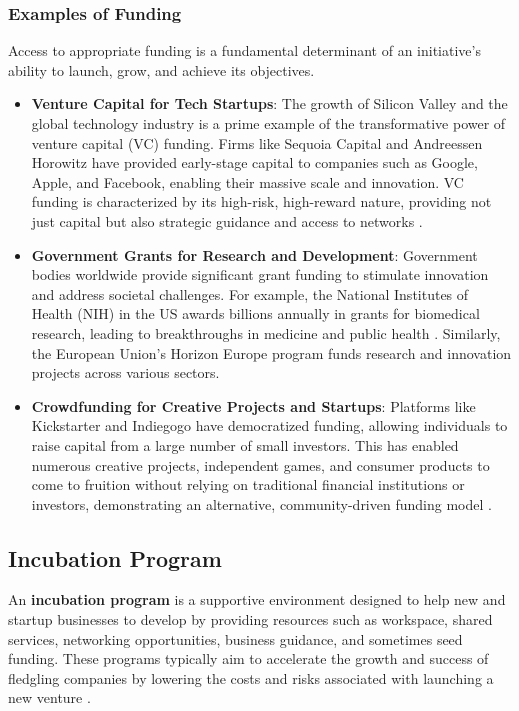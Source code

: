 \documentclass[../Main.tex]{subfiles}
\begin{document}
\subsubsection*{Examples of Funding}
Access to appropriate funding is a fundamental determinant of an initiative's ability to launch, grow, and achieve its objectives.
\begin{itemize}
    \item \textbf{Venture Capital for Tech Startups}: The growth of Silicon Valley and the global technology industry is a prime example of the transformative power of venture capital (VC) funding. Firms like Sequoia Capital and Andreessen Horowitz have provided early-stage capital to companies such as Google, Apple, and Facebook, enabling their massive scale and innovation. VC funding is characterized by its high-risk, high-reward nature, providing not just capital but also strategic guidance and access to networks \cite{lerner2012venture}.
    \item \textbf{Government Grants for Research and Development}: Government bodies worldwide provide significant grant funding to stimulate innovation and address societal challenges. For example, the National Institutes of Health (NIH) in the US awards billions annually in grants for biomedical research, leading to breakthroughs in medicine and public health \cite{NIH2024}. Similarly, the European Union's Horizon Europe program funds research and innovation projects across various sectors.
    \item \textbf{Crowdfunding for Creative Projects and Startups}: Platforms like Kickstarter and Indiegogo have democratized funding, allowing individuals to raise capital from a large number of small investors. This has enabled numerous creative projects, independent games, and consumer products to come to fruition without relying on traditional financial institutions or investors, demonstrating an alternative, community-driven funding model \cite{mollick2014dynamics}.
\end{itemize}

\subsection{Incubation Program}
An \textbf{incubation program} is a supportive environment designed to help new and startup businesses to develop by providing resources such as workspace, shared services, networking opportunities, business guidance, and sometimes seed funding. These programs typically aim to accelerate the growth and success of fledgling companies by lowering the costs and risks associated with launching a new venture \cite{hackett2004business,europeancommission2014incubators}.
\end{document}
